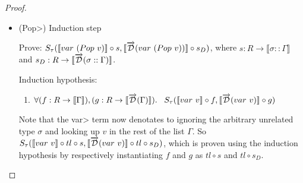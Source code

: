 \documentclass[11pt, final]{article}
\begin{document}
\begin{proof}
\begin{enumerate}
\begin{itemize}
          \item(\<Pop>) Induction step

          Prove: $S_\tau(\llbracket var\ (Pop\ v) \rrbracket \circ s, \llbracket \overrightarrow{\mathcal{D}}(var\ (Pop\ v)) \rrbracket \circ s_D)$, where $s : R \rightarrow \llbracket \sigma :: \Gamma \rrbracket$ and $s_D : R \rightarrow \llbracket \overrightarrow{\mathcal{D}}(\sigma :: \Gamma) \rrbracket$.

          Induction hypothesis:
          \begin{enumerate}\label{eqn:subst_ih_var_Pop}
            \item $\forall (f : R \rightarrow \llbracket \Gamma \rrbracket), (g : R \rightarrow \llbracket \overrightarrow{\mathcal{D}}(\Gamma) \rrbracket). \\
            \;\;\;S_\tau(\llbracket var\ v \rrbracket \circ f, \llbracket \overrightarrow{\mathcal{D}}(var\ v) \rrbracket \circ g)$
          \end{enumerate}

          Note that the \<var> term now denotates to ignoring the arbitrary unrelated type $\sigma$ and looking up $v$ in the rest of the list $\Gamma$.
          So $S_\tau(\llbracket var\ v \rrbracket \circ tl \circ s, \llbracket \overrightarrow{\mathcal{D}}(var\ v) \rrbracket \circ tl \circ s_D)$, which is proven using the induction hypothesis by respectively instantiating $f$ and $g$ as $tl \circ s$ and $tl \circ s_D$.


\end{itemize}
\end{enumerate}
\end{proof}
\end{document}
